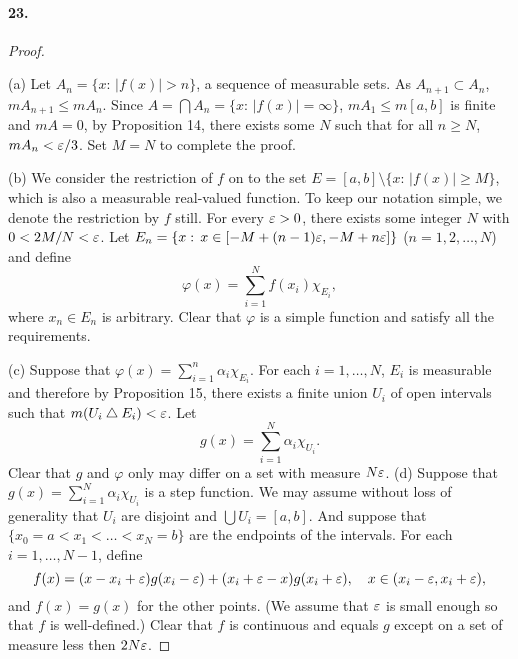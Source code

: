   \paragraph{23.}
  \begin{proof}
    $\,$\par
    (a) Let $A_n=\{x:\,|f(x)|>n\}$, a sequence of measurable sets. As $A_{n+1}
    \subset A_n$, $mA_{n+1}\le mA_n$. Since $A=\bigcap A_n = \{x:\,|f(x)|=\infty
    \}$, $mA_1\le m[a,b]$ is finite and $mA=0$, by Proposition 14, there exists
    some $N$ such that for all $n\ge N$, $mA_n<\varepsilon/3$. Set $M=N$ to complete 
    the proof.\par
    (b) We consider the restriction of $f$ on to the set $E=[a,b]\setminus\{x:\,
    |f(x)|\ge M\}$, which is also a measurable real-valued function. To keep our 
    notation simple, we denote the restriction by $f$ still. For every $\varepsilon>0$,
    there exists some integer $N$ with $0<2M/N<\varepsilon$. Let $E_n=\{x:\,x\in
    [-M+(n-1)\varepsilon, -M+n\varepsilon]\}$ ($n=1,2,\dots,N$) and define 
    \[
      \varphi(x) = \sum_{i=1}^N f(x_i)\chi_{E_i},
    \]
    where $x_n\in E_n$ is arbitrary. Clear that $\varphi$ is a simple function 
    and satisfy all the requirements.\par
    (c) Suppose that $\varphi(x)=\sum_{i=1}^n \alpha_i\chi_{E_i}$. For each $i
    =1,\dots,N$, $E_i$ is measurable and therefore by Proposition 15, there 
    exists a finite union $U_i$ of open intervals such that $m(U_i\bigtriangleup
    E_i)<\varepsilon$. Let 
    \[
      g(x) = \sum_{i=1}^N \alpha_i\chi_{U_i}.
    \]
    Clear that $g$ and $\varphi$ only may differ on a set with measure $N\varepsilon$.
    (d) Suppose that $g(x)=\sum_{i=1}^N\alpha_i\chi_{U_i}$ is a step function. 
    We may assume without loss of generality that $U_i$ are disjoint and 
    $\bigcup U_i = [a,b]$. And suppose that $\{x_0=a < x_1 < \dots < x_N=b\}$ 
    are the endpoints of the intervals. For each $i=1,\dots,N-1$, define
    \[
      f(x) = (x-x_i+\varepsilon)g(x_i-\varepsilon) + (x_i+\varepsilon - x)g(x_i+\varepsilon),\quad
      x\in (x_i-\varepsilon, x_i+\varepsilon),
    \]
    and $f(x)=g(x)$ for the other points. (We assume that $\varepsilon$ is small enough
    so that $f$ is well-defined.) Clear that $f$ is continuous and equals $g$
    except on a set of measure less then $2N\varepsilon$.
  \end{proof}

